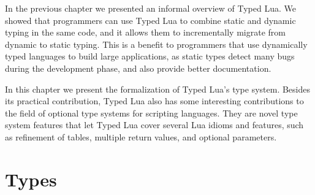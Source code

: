 
In the previous chapter we presented an informal overview of Typed Lua.
We showed that programmers can use Typed Lua to combine static and dynamic
typing in the same code, and it allows them to incrementally migrate from
dynamic to static typing.
This is a benefit to programmers that use dynamically typed languages
to build large applications, as static types detect many bugs
during the development phase, and also provide better documentation.

In this chapter we present the formalization of Typed Lua's type system.
Besides its practical contribution, Typed Lua also has some interesting
contributions to the field of optional type systems for scripting
languages.
They are novel type system features that let Typed Lua cover several Lua idioms
and features, such as refinement of tables, multiple return values,
and optional parameters.

\section{Types}
\label{sec:types}


